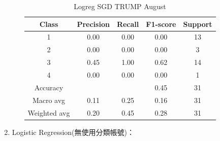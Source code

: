 \begin{enumerate}
\begin{enumerate}
\begin{table}[H]
            \vspace{1em}
            
            \scriptsize
            \begin{tabular}{c|cccc}
            \hline
            Class & Precision & Recall & F1-score & Support \\
            \hline
            1 & 0.00 & 0.00 & 0.00 & 13 \\
            2 & 0.00 & 0.00 & 0.00 & 3 \\
            3 & 0.45 & 1.00 & 0.62 & 14 \\
            4 & 0.00 & 0.00 & 0.00 & 1 \\
            \hline
            Accuracy &       &      & 0.45 & 31 \\
            Macro avg & 0.11 & 0.25 & 0.16 & 31 \\
            Weighted avg & 0.20 & 0.45 & 0.28 & 31 \\
            \hline
            \end{tabular}
            \caption{Logreg SGD TRUMP August}
            \label{tab:classifier_2_report_logreg_sgd_trump_filtered_aug}
            \end{table}



            
        \end{enumerate}

        \pagebreak

        \item Logistic Regression(無使用分類帳號)：


\end{enumerate}
